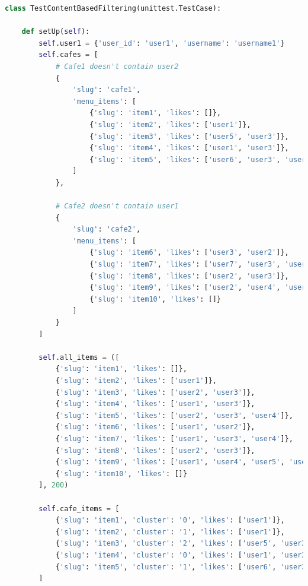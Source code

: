 \documentclass[11pt]{article}
\begin{document}
\begin{lstlisting}[language=Python, caption=Méthode setUp]
class TestContentBasedFiltering(unittest.TestCase):

    def setUp(self):
        self.user1 = {'user_id': 'user1', 'username': 'username1'}
        self.cafes = [
            # Cafe1 doesn't contain user2
            {
                'slug': 'cafe1',
                'menu_items': [
                    {'slug': 'item1', 'likes': []}, 
                    {'slug': 'item2', 'likes': ['user1']},
                    {'slug': 'item3', 'likes': ['user5', 'user3']},
                    {'slug': 'item4', 'likes': ['user1', 'user3']},
                    {'slug': 'item5', 'likes': ['user6', 'user3', 'user4']}
                ]
            }, 

            # Cafe2 doesn't contain user1
            {
                'slug': 'cafe2',
                'menu_items': [
                    {'slug': 'item6', 'likes': ['user3', 'user2']}, 
                    {'slug': 'item7', 'likes': ['user7', 'user3', 'user4']},
                    {'slug': 'item8', 'likes': ['user2', 'user3']},
                    {'slug': 'item9', 'likes': ['user2', 'user4', 'user5', 'user6']},
                    {'slug': 'item10', 'likes': []}
                ]
            }
        ]

        self.all_items = ([
            {'slug': 'item1', 'likes': []}, 
            {'slug': 'item2', 'likes': ['user1']},
            {'slug': 'item3', 'likes': ['user2', 'user3']},
            {'slug': 'item4', 'likes': ['user1', 'user3']},
            {'slug': 'item5', 'likes': ['user2', 'user3', 'user4']},
            {'slug': 'item6', 'likes': ['user1', 'user2']}, 
            {'slug': 'item7', 'likes': ['user1', 'user3', 'user4']},
            {'slug': 'item8', 'likes': ['user2', 'user3']},
            {'slug': 'item9', 'likes': ['user1', 'user4', 'user5', 'user6']},
            {'slug': 'item10', 'likes': []}
        ], 200)

        self.cafe_items = [
            {'slug': 'item1', 'cluster': '0', 'likes': ['user1']}, 
            {'slug': 'item2', 'cluster': '1', 'likes': ['user1']},
            {'slug': 'item3', 'cluster': '2', 'likes': ['user5', 'user3']},
            {'slug': 'item4', 'cluster': '0', 'likes': ['user1', 'user3']},
            {'slug': 'item5', 'cluster': '1', 'likes': ['user6', 'user3', 'user4']}
        ]
\end{lstlisting}
\end{document}
